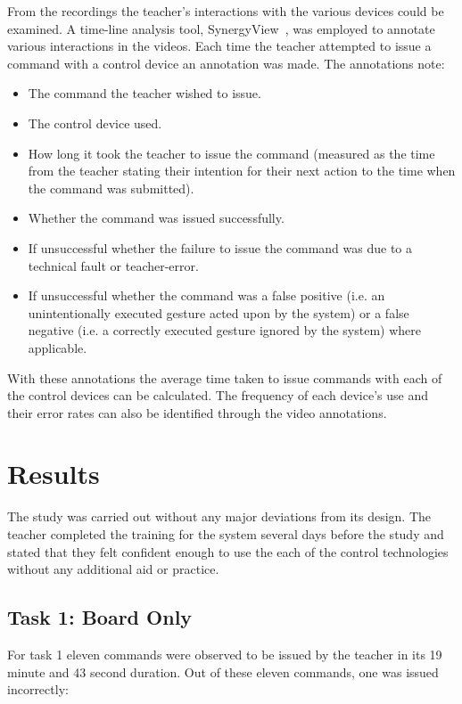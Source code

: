 \documentclass[link]{IWCOMP}
\begin{document}
From the recordings the teacher's interactions with the various devices could be examined.
A time-line analysis tool, SynergyView~\cite{Kyaw2011}, was employed to annotate various interactions in the videos.
Each time the teacher attempted to issue a command with a control device an annotation was made.
The annotations note:
\begin{itemize}
\item The command the teacher wished to issue.
\item The control device used.
\item How long it took the teacher to issue the command (measured as the time from the teacher stating their intention for their next action to the time when the command was submitted).
\item Whether the command was issued successfully.
\item If unsuccessful whether the failure to issue the command was due to a technical fault or teacher-error.
\item If unsuccessful whether the command was a false positive (i.e. an unintentionally executed gesture acted upon by the system) or a false negative (i.e. a correctly executed gesture ignored by the system) where applicable.
\end{itemize}
With these annotations the average time taken to issue commands with each of the control devices can be calculated.
The frequency of each device's use and their error rates can also be identified through the video annotations.

\section{Results}
\label{sec:results}

The study was carried out without any major deviations from its design.
The teacher completed the training for the system several days before the study and stated that they felt confident enough to use the each of the control technologies without any additional aid or practice.

\subsection{Task 1: Board Only}
\label{subsec:resultsTask1}

For task 1 eleven commands were observed to be issued by the teacher in its 19 minute and 43 second duration.
Out of these eleven commands, one was issued incorrectly:
\end{document}

